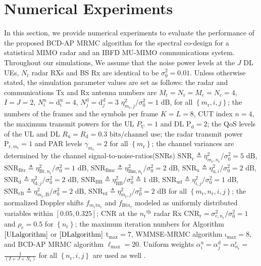 \documentclass[9pt,journal]{IEEEtran}
\newcommand{\paren}[1]{\left({#1}\right)}
\newcommand{\bracket}[1]{{\left [{#1}\right ]}}
\newcommand{\braces}[1]{{\left\{ {#1}\right\}}}
\newcommand{\ith}[1]    {{#1}^{\underline{\text{th}}}}
\newcommand{\rr}{_\mathrm{r}}
\newcommand{\cc}{_\mathrm{c}}
\newcommand{\sfrac}[2]{#1/#2}
\theoremstyle{definition}
\begin{document}
\section{Numerical Experiments}
\label{sec:numerical}
In this section, we provide numerical experiments to evaluate the performance of the proposed BCD-AP MRMC algorithm for the spectral co-design for a statistical MIMO radar and an IBFD MU-MIMO communications system. Throughout our simulations,  We assume that the noise power levels at the $\mathit{J}$ DL UEs, $\mathit{N}\rr$ radar RXs and BS Rx are identical to be $\sigma^2_0=0.01$. Unless otherwise stated, the simulation parameter values are set as follows: the radar and communications Tx and Rx antenna numbers are $\mathit{M}\rr=\mathit{N}\rr=\mathit{M}\cc=\mathit{N}\cc=4$, $\mathit{I}=\mathit{J}=2$, $\mathit{N}^{\textrm{u}}_i=\mathrm{d}^{\textrm{u}}_i=4$, $\mathit{N}^{\textrm{d}}_j=\mathrm{d}^{\textrm{d}}_j=3$  $\sfrac{\eta^2_{m\rr,j}}{\sigma^2_0}=1\textrm{ dB}$, for all $\braces{m\rr,i,j}$; the numbers of the frames and the symbols per frame $\mathit{K}=\mathit{L}=8$, CUT index $n=4$, the maximum transmit powers for the UL $\mathit{P}_\textrm{U}=1$ and DL $\mathrm{P}_\textrm{d}=2$; the QoS levels of the UL and DL $\mathit{R}_{\textrm{u}}=\mathit{R}_{\textrm{d}}=0.3\textrm{ bits/channel use}$; the radar transmit power $\mathrm{P}_{\textrm{r},m\rr}=1$ and PAR levels $\gamma_{m\rr}=2$ for all $\braces{m\rr}$; the channel variances are determined by the channel signal-to-noise-ratios(SNRs) $\mathrm{SNR}_{\textrm{r}}\triangleq\sfrac{\eta^2_{m\rr,n\rr}}{\sigma^2_{0}}=5\textrm{ dB}$, $\mathrm{SNR}_{\textrm{Btr}}\triangleq\sfrac{\eta^2_{\textrm{Bt},n\rr}}{\sigma^2_{0}}=1 \textrm{ dB}$, $\mathrm{SNR}_{\textrm{Bmr}}\triangleq\sfrac{\eta^2_{\textrm{Bm},n\rr}}{\sigma^2_{0}}=2 \textrm{ dB}$, $\mathrm{SNR}_{\textrm{u}}\triangleq\sfrac{\eta^2_{\textrm{u},i}}{\sigma^2_{0}}=2\textrm{ dB}$, $\mathrm{SNR}_{\textrm{d}}\triangleq\sfrac{\eta^2_{\textrm{d},j}}{\sigma^2_0}=2\textrm{ dB}$, $\mathrm{SNR}_{\textrm{BB}}\triangleq\sfrac{\eta^2_{\textrm{BB}}}{\sigma^2_{0}}\triangleq1\textrm{ dB}$, $\mathrm{SNR}_{\textrm{ud}}\triangleq\sfrac{\eta^2_{i,j}}{\sigma^2_{0}}=1\textrm{ dB}$, $\mathrm{SNR}_{\textrm{rB}}\triangleq\sfrac{\eta^2_{m\rr,\textrm{B}}}{\sigma^2_0}=2\textrm{ dB}$, $\mathrm{SNR}_{\textrm{rd}}\triangleq\sfrac{\eta^2_{m\rr,j}}{\sigma^2_0}=2\textrm{ dB}$ for all $\braces{m\rr,n\rr,i,j}$; the normalized Doppler shifts $f_{m\rr\textrm{t}n\rr}$ and $f_{\textrm{Bt}n\rr}$ modeled as uniformly distributed variables within $\bracket{0.05,0.325}$; CNR at the $\ith{n\rr}$ radar Rx $\mathrm{CNR}_{\textrm{r}}=\sfrac{\sigma^2_{\text{c},n\rr}}{\sigma^2_0}=1$ and $\rho_{\textrm{c}}=0.5$ for $\braces{n\rr}$; the maximum iteration numbers for Algorithm $\ref{ULalgorithm}$ or $\ref{DLalgorithm}$ $\mathrm{t}_{\textrm{max}}=7$, WMMSE-MRMC algorithm $\mathrm{\iota}_{\textrm{max}}=8$, and BCD-AP MRMC algorithm $\mathrm{\ell}_{\textrm{max}}=20$. Uniform weights  $\alpha^\textrm{u}_{i}= \alpha^{\textrm{d}}_{j}=\alpha^\textrm{r}_{n\rr}=$ $\frac{1}{\paren{\mathit{I}+\mathit{J}+\mathit{N}\rr}}$ for all $\braces{n\rr,i,j}$ are used as well .
\end{document}
